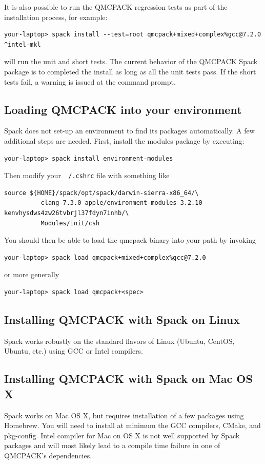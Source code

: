 It is also possible to run the QMCPACK regression tests as part of the
installation process, for example:
\verbatimfont{\footnotesize}
\begin{verbatim}
your-laptop> spack install --test=root qmcpack+mixed+complex%gcc@7.2.0 ^intel-mkl
\end{verbatim}
will run the unit and short tests. The current behavior of the QMCPACK
Spack package is to completed the install as long as all the unit tests
pass. If the short tests fail, a warning is issued at the command prompt.

\subsection{Loading QMCPACK into your environment}
Spack does not set-up an environment to find its packages
automatically. A few additional steps are needed. First, install the
modules package by executing:
\verbatimfont{\footnotesize}
\begin{verbatim}
your-laptop> spack install environment-modules
\end{verbatim}

Then modify your\texttt{ ~/.cshrc} file with something like
\verbatimfont{\footnotesize}
\begin{verbatim}
source ${HOME}/spack/opt/spack/darwin-sierra-x86_64/\
          clang-7.3.0-apple/environment-modules-3.2.10-kenvhysdws4zw26tvbrjl37fdyn7inhb/\
          Modules/init/csh
\end{verbatim}

You should then be able to load the qmcpack binary into your path by
invoking
\verbatimfont{\footnotesize}
\begin{verbatim}
your-laptop> spack load qmcpack+mixed+complex%gcc@7.2.0
\end{verbatim}
or more generally
\verbatimfont{\footnotesize}
\begin{verbatim}
your-laptop> spack load qmcpack+<spec>
\end{verbatim}

\subsection{Installing QMCPACK with Spack on Linux}
Spack works robustly on the standard flavors of Linux (Ubuntu, CentOS,
Ubuntu, etc.) using GCC or Intel compilers.

\subsection{Installing QMCPACK with Spack on Mac OS X}
Spack works on Mac OS X, but requires installation of a few packages
using Homebrew. You will need to install at minimum the GCC compilers,
CMake, and pkg-config. Intel compiler for Mac on OS X is not well
supported by Spack packages and will most likely lead to a compile
time failure in one of QMCPACK's dependencies.


